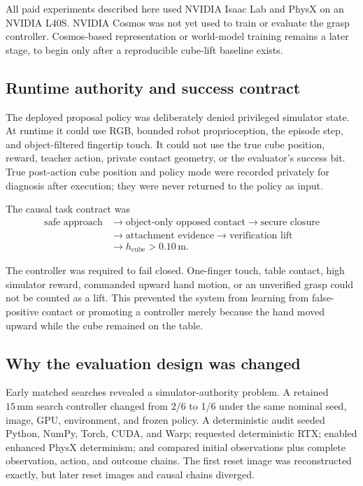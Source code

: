 All paid experiments described here used NVIDIA Isaac Lab and PhysX on an
NVIDIA L40S.  NVIDIA Cosmos was not yet used to train or evaluate the grasp
controller.  Cosmos-based representation or world-model training remains a
later stage, to begin only after a reproducible cube-lift baseline exists.

\subsection{Runtime authority and success contract}

The deployed proposal policy was deliberately denied privileged simulator
state.  At runtime it could use RGB, bounded robot proprioception, the episode
step, and object-filtered fingertip touch.  It could not use the true cube
position, reward, teacher action, private contact geometry, or the evaluator's
success bit.  True post-action cube position and policy mode were recorded
privately for diagnosis after execution; they were never returned to the
policy as input.

The causal task contract was
\begin{equation}
\begin{aligned}
\text{safe approach}
&\rightarrow \text{object-only opposed contact}
\rightarrow \text{secure closure}\\
&\rightarrow \text{attachment evidence}
\rightarrow \text{verification lift}\\
&\rightarrow h_{\mathrm{cube}}>0.10\,\mathrm{m}.
\end{aligned}
\label{eq:direct-franka-lift-contract}
\end{equation}

The controller was required to fail closed.  One-finger touch, table contact,
high simulator reward, commanded upward hand motion, or an unverified grasp
could not be counted as a lift.  This prevented the system from learning from
false-positive contact or promoting a controller merely because the hand moved
upward while the cube remained on the table.

\subsection{Why the evaluation design was changed}

Early matched searches revealed a simulator-authority problem.  A retained
$15\,\mathrm{mm}$ search controller changed from 2/6 to 1/6 under the same
nominal seed, image, GPU, environment, and frozen policy.  A deterministic
audit seeded Python, NumPy, Torch, CUDA, and Warp; requested deterministic RTX;
enabled enhanced PhysX determinism; and compared initial observations plus
complete observation, action, and outcome chains.  The first reset image was
reconstructed exactly, but later reset images and causal chains diverged.

